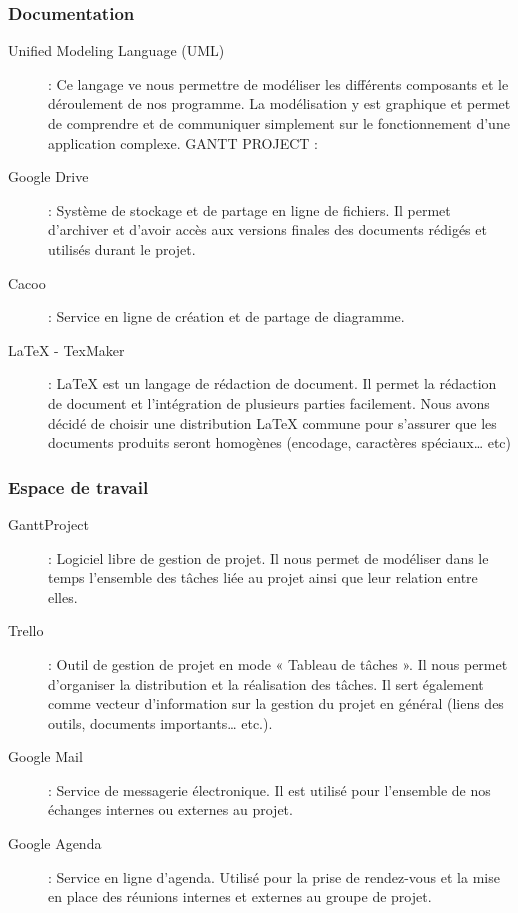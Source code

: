 \documentclass[10pt,a4paper]{article}
\begin{document}
\subsubsection{Documentation}
\begin{description}
\item [Unified Modeling Language (UML)] : Ce langage ve nous permettre de modéliser les différents composants et le déroulement de nos programme. La modélisation y est graphique et permet de comprendre et de communiquer simplement sur le fonctionnement d'une application complexe.
GANTT PROJECT :
\item [Google Drive] : Système de stockage et de partage en ligne de fichiers. Il permet d'archiver et d'avoir accès aux versions finales des documents rédigés et utilisés durant le projet. 
\item [Cacoo] : Service en ligne de création et de partage de diagramme.
\item [LaTeX - TexMaker] : LaTeX est un langage de rédaction de document. Il permet la rédaction de document et l'intégration de plusieurs parties facilement. Nous avons décidé de choisir une distribution LaTeX commune pour s'assurer que les documents produits seront homogènes (encodage, caractères spéciaux… etc)
\end{description}

\subsubsection{Espace de travail}
\begin{description}
\item [GanttProject] : Logiciel libre de gestion de projet. Il nous permet de modéliser dans le temps l'ensemble des tâches liée au projet ainsi que leur relation entre elles.
\item [Trello] : Outil de gestion de projet en mode « Tableau de tâches ». Il nous permet d'organiser la distribution et la réalisation des tâches. Il sert également comme vecteur d'information sur la gestion du projet en général (liens des outils, documents importants… etc.).
\item [Google Mail] : Service de messagerie électronique. Il est utilisé pour l’ensemble de nos échanges internes ou externes au projet.
\item [Google Agenda] : Service en ligne d'agenda. Utilisé pour la prise de rendez-vous et la mise en place des réunions internes et externes au groupe de projet. 
\end{description}
 
\end{document}
